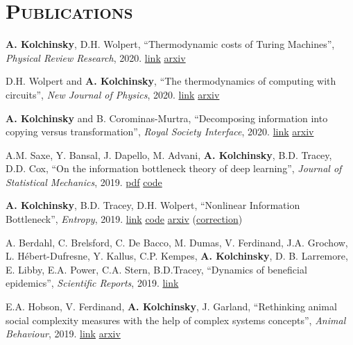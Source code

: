 

\section{\textsc{Publications}}

\textbf{A. Kolchinsky}, D.H. Wolpert, ``Thermodynamic costs of Turing Machines'', \emph{Physical Review Research}, 2020. \href{https://journals.aps.org/prresearch/abstract/10.1103/PhysRevResearch.2.033312}{link} \href{https://arxiv.org/abs/1912.04685}{arxiv}


D.H. Wolpert and \textbf{A. Kolchinsky}, ``The thermodynamics of computing with circuits'', \emph{New Journal of Physics}, 2020. \href{https://iopscience.iop.org/article/10.1088/1367-2630/ab82b8}{link} \href{https://arxiv.org/abs/1806.04103}{arxiv}


\textbf{A. Kolchinsky} and B. Corominas-Murtra, 
``Decomposing information into copying versus transformation'', 
\emph{Royal Society Interface}, 2020. 
\href{https://royalsocietypublishing.org/doi/10.1098/rsif.2019.0623}{link}
\href{https://arxiv.org/abs/1903.10693}{arxiv}

A.M. Saxe, Y. Bansal, J. Dapello, M. Advani, \textbf{A. Kolchinsky}, B.D. Tracey, D.D. Cox, 
``On the information bottleneck theory of deep learning'',  \emph{Journal of Statistical Mechanics}, 2019. 
\href{https://iopscience.iop.org/article/10.1088/1742-5468/ab3985/pdf}{pdf} 
\href{https://github.com/artemyk/ibsgd/tree/iclr2018}{code}



\textbf{A. Kolchinsky}, B.D. Tracey, D.H. Wolpert, ``Nonlinear Information Bottleneck'', \emph{Entropy}, 2019.
\href{https://www.mdpi.com/1099-4300/21/12/1181}{link}
\href{https://github.com/artemyk/nonlinearIB}{code}
\href{https://arxiv.org/abs/1705.02436}{arxiv} (\href{https://www.mdpi.com/1099-4300/19/11/588}{correction})


A. Berdahl, C. Brelsford, C. De Bacco, M. Dumas, V. Ferdinand, J.A. Grochow, L. Hébert-Dufresne,
Y. Kallus, C.P. Kempes, \textbf{A. Kolchinsky}, D. B. Larremore,
E. Libby, E.A. Power, C.A. Stern, B.D.Tracey, ``Dynamics of beneficial epidemics'', \emph{Scientific Reports}, 2019. 
\href{https://www.nature.com/articles/s41598-019-50039-w}{link}


E.A. Hobson, V. Ferdinand, \textbf{A. Kolchinsky}, J. Garland, 
``Rethinking animal social complexity measures with the help of complex systems concepts'', 
\emph{Animal Behaviour}, 2019. 
\href{https://www.sciencedirect.com/science/article/pii/S0003347219301666}{link}
\href{https://arxiv.org/abs/1812.01185}{arxiv} 

